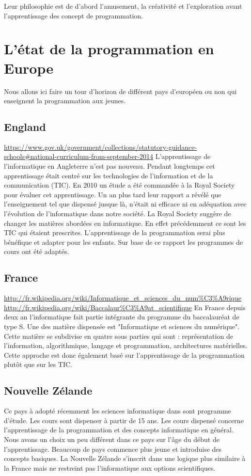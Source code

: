 Leur philosophie est de d'abord l'amusement, la créativité et l'exploration avant l'apprentissage des concept de programmation.

\section{L'état de la programmation en Europe}
Nous allons ici faire un tour d'horizon de différent pays d'européen ou non qui enseignent la programmation aux jeunes. 
\subsection{England}
\url{https://www.gov.uk/government/collections/statutory-guidance-schools#national-curriculum-from-september-2014}
L'apprentissage de l'informatique en Angleterre n'est pas nouveau. Pendant longtemps cet apprentissage était centré sur les technologies de l'information et de la communication (TIC). En 2010 un étude a été commandée à la Royal Society pour évaluer cet apprentissage. Un an plus tard leur rapport a révélé que l'enseignement tel que dispensé jusque là, n'était ni efficace ni en adéquation avec l'évolution de l'informatique dans notre société. La Royal Society suggère de changer les matières abordées en informatique. En effet précédemment ce sont les TIC qui étaient prescrites. L'apprentissage de la programmation serai plus bénéfique et adapter pour les enfants. Sur base de ce rapport les programmes de cours ont été adaptés.


\subsection{France}
\url{http://fr.wikipedia.org/wiki/Informatique\_et\_sciences\_du\_num\%C3\%A9rique}
\url{http://fr.wikipedia.org/wiki/Baccalaur\%C3\%A9at\_scientifique}
En France depuis deux an l'informatique fait partie intégrante du programme du baccalauréat de type S. Une des matière dispensée est "Informatique et sciences du numérique". Cette matière se subdivise en quatre sous parties qui sont : représentation de l'information, algorithmique, langage et programmation, architectures matérielles. Cette approche est donc également basé sur l'apprentissage de la programmation plutôt que sur les TIC.

\subsection{Nouvelle Zélande}
Ce pays à adopté récemment les sciences informatique dans sont programme d'étude. Les cours sont dispenser à partir de 15 ans. Les cours dispensé concerne l'apprentissage de la programmation et des concepts informatique en général. Nous avons un choix un peu différent dans ce pays sur l'âge du début de l'apprentissage. Beaucoup de pays commence plus jeune et introduise des concepts basiques. La Nouvelle Zélande s'inscrit dans une logique plus similaire à la France mais ne restreint pas l'informatique aux options scientifiques.


